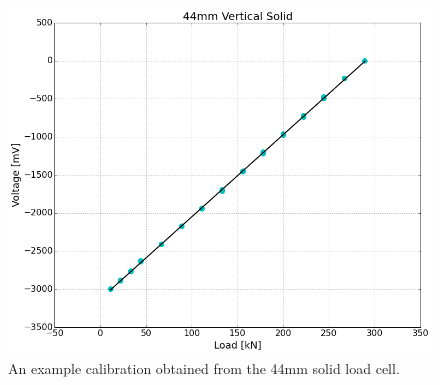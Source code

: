 \begin{figure}
	\centering
		\includegraphics[scale=0.35]{appendix_load_calibration/ex_load_cell_fit.png}
   	\caption{An example calibration obtained from the 44mm solid load cell. }
  	\label{ex_load_cell_fit}
\end{figure}
